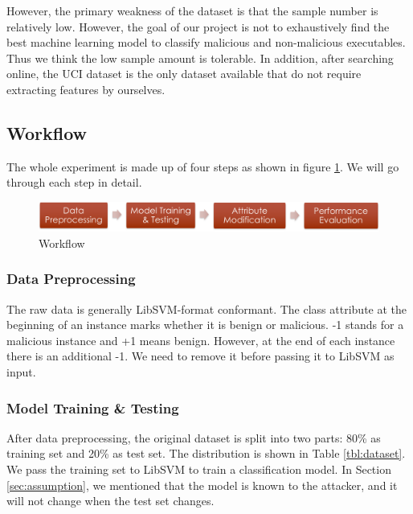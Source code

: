 \documentclass[11pt]{article}
\begin{document}
However, the primary weakness of the dataset is that the sample number is relatively low. However, the goal of our project is not to exhaustively find the best machine learning model to classify malicious and non-malicious executables. Thus we think the low sample amount is tolerable. In addition, after searching online, the UCI dataset is the only dataset available that do not require extracting features by ourselves.


\subsection{Workflow}
The whole experiment is made up of four steps as shown in figure \ref{fig:workflow}. %
We will go through each step in detail.

\begin{figure}[htbp]
\centering
\includegraphics*[width=\textwidth]{fig/workflow.png}
\caption{Workflow}
\label{fig:workflow}
\end{figure}

\subsubsection{Data Preprocessing}
The raw data is generally LibSVM-format conformant. The class attribute at the beginning of an instance marks whether it is benign or malicious. -1 stands for a malicious instance and +1 means benign. However, at the end of each instance there is an additional -1. We need to remove it before passing it to LibSVM as input.

\subsubsection{Model Training \& Testing}
After data preprocessing, the original dataset is split into two parts: 80\% as training set and 20\% as test set. The distribution is shown in Table \ref{tbl:dataset}. We pass the training set to LibSVM to train a classification model. In Section \ref{sec:assumption}, we mentioned that the model is known to the attacker, and it will not change when the test set changes. %
\end{document}
